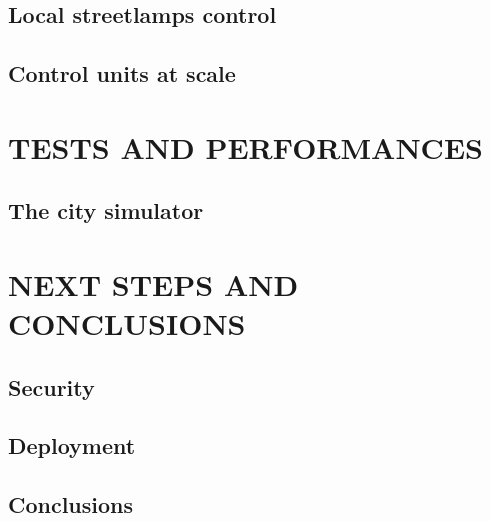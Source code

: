 \subsection{Local streetlamps control}
\subsection{Control units at scale}


\section{TESTS AND PERFORMANCES}

\subsection{The city simulator}


\section{NEXT STEPS AND CONCLUSIONS}

\subsection{Security}

\subsection{Deployment}

\subsection{Conclusions}


